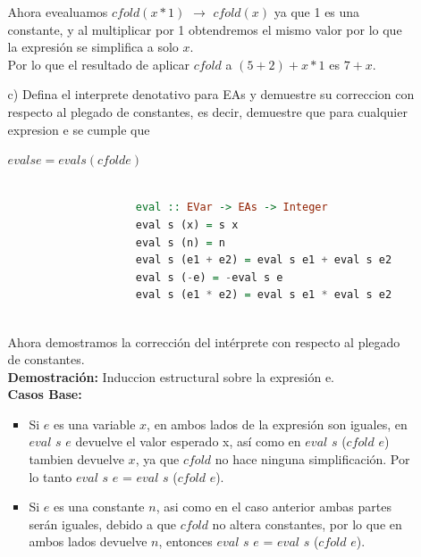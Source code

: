 \documentclass{article}
\begin{document}
\begin{itemize}
\begin{itemize}
                Ahora evealuamos $cfold(x * 1)$ $\rightarrow$ $cfold(x)$ ya que 1 es una constante, y al multiplicar por 1 obtendremos el mismo valor por lo que la expresión se simplifica a solo $x$.\\

                Por lo que el resultado de aplicar $cfold$ a $(5 + 2) + x * 1$ es $7 + x$.\\
                
                \item[c)] Defina el interprete denotativo para EAs y demuestre su correccion con respecto al plegado de constantes, es decir, demuestre que para cualquier expresion e se cumple que
                    \begin{center}
                        $eval s e = eval s (cfold e)$
                    \end{center}

                \begin{lstlisting}[language=Haskell]
                
                    eval :: EVar -> EAs -> Integer
                    eval s (x) = s x  
                    eval s (n) = n    
                    eval s (e1 + e2) = eval s e1 + eval s e2 
                    eval s (-e) = -eval s e                 
                    eval s (e1 * e2) = eval s e1 * eval s e2
                    
                \end{lstlisting}    
                Ahora demostramos la corrección del intérprete con respecto al plegado de constantes.\\

                \textbf{Demostración:} Induccion estructural sobre la expresión e.\\
                
                \textbf{Casos Base:}
                \begin{itemize}
                \item Si $e$ es una variable $x$, en ambos lados de la expresión son iguales, en $eval$ $s$ $e$ devuelve el valor esperado x, así como en $eval$ $s$ ($cfold$ $e$) tambien devuelve $x$, ya que $cfold$ no hace ninguna simplificación. Por lo tanto $eval$ $s$ $e$ = $eval$ $s$ ($cfold$ $e$).\\

                \item Si $e$ es una constante $n$, asi como en el caso anterior ambas partes serán iguales, debido a que $cfold$ no altera constantes, por lo que en ambos lados devuelve $n$, entonces $eval$ $s$ $e$ = $eval$ $s$ ($cfold$ $e$).\\
                \end{itemize}


\end{itemize}
\end{itemize}
\end{document}
